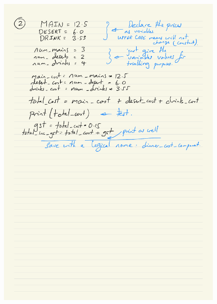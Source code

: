 \documentclass[a4paper,12pt]{article}
\begin{document}
\begin{figure} [!h]
	\centering
	\includegraphics[width=12cm]{iterative_processes/Components_detailed_p2.pdf}
\end{figure}
\end{document}
